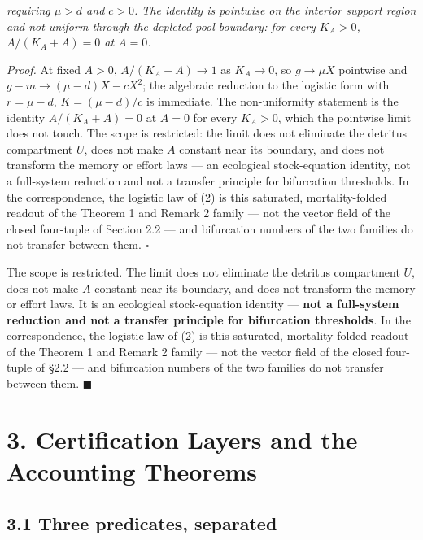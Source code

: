 \documentclass[11pt]{article}
\begin{document}
 \emph{requiring \(\mu > d\) and \(c > 0\). The identity is pointwise on the interior support region and not uniform through the depleted-pool boundary: for every \(K_A > 0\), \(A/(K_A + A) = 0\) at \(A = 0\).}

\emph{Proof.} At fixed \(A > 0\), \(A/(K_A + A) \to 1\) as \(K_A \to 0\), so \(g \to \mu X\) pointwise and \(g - m \to (\mu - d)X - cX^2\); the algebraic reduction to the logistic form with \(r = \mu - d\), \(K = (\mu - d)/c\) is immediate. The non-uniformity statement is the identity \(A/(K_A + A) = 0\) at \(A = 0\) for every \(K_A > 0\), which the pointwise limit does not touch. The scope is restricted: the limit does not eliminate the detritus compartment \(U\), does not make \(A\) constant near its boundary, and does not transform the memory or effort laws --- an ecological stock-equation identity, not a full-system reduction and not a transfer principle for bifurcation thresholds. In the correspondence, the logistic law of (2) is this saturated, mortality-folded readout of the Theorem 1 and Remark 2 family --- not the vector field of the closed four-tuple of Section 2.2 --- and bifurcation numbers of the two families do not transfer between them. \(\square\)

\vspace{0.8em}

The scope is restricted. The limit does not eliminate the detritus compartment \(U\), does not make \(A\) constant near its boundary, and does not transform the memory or effort laws. It is an ecological stock-equation identity --- \textbf{not a full-system reduction and not a transfer principle for bifurcation thresholds}. In the correspondence, the logistic law of (2) is this saturated, mortality-folded readout of the Theorem 1 and Remark 2 family --- not the vector field of the closed four-tuple of \S2.2 --- and bifurcation numbers of the two families do not transfer between them. \(\blacksquare\)

\section*{3. Certification Layers and the Accounting Theorems}\label{3-certification-layers-and-the-accounting-theorems}

\subsection*{3.1 Three predicates, separated}\label{31-three-predicates-separated}
\end{document}
